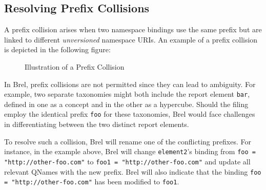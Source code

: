 

\subsection{Resolving Prefix Collisions}

A prefix collision arises when two namespace bindings use the same prefix but are linked to different \textit{unversioned} namespace URIs.
An example of a prefix collision is depicted in the following figure:

\begin{figure}[H]
    \caption{Illustration of a Prefix Collision}
    \label{fig:prefix_collision_example}
\end{figure}

In Brel, prefix collisions are not permitted since they can lead to ambiguity.
For example, two separate taxonomies might both include the report element \texttt{bar}, defined in one as a concept and in the other as a hypercube.
Should the filing employ the identical prefix \texttt{foo} for these taxonomies, Brel would face challenges in differentiating between the two distinct report elements.

To resolve such a collision, Brel will rename one of the conflicting prefixes.
For instance, in the example above,
Brel will change \texttt{element2}'s binding from \texttt{foo = "http://other-foo.com"} to \texttt{foo1 = "http://other-foo.com"} and update all relevant QNames with the new prefix.
Brel will also indicate that the binding \texttt{foo = "http://other-foo.com"} has been modified to \texttt{foo1}.

